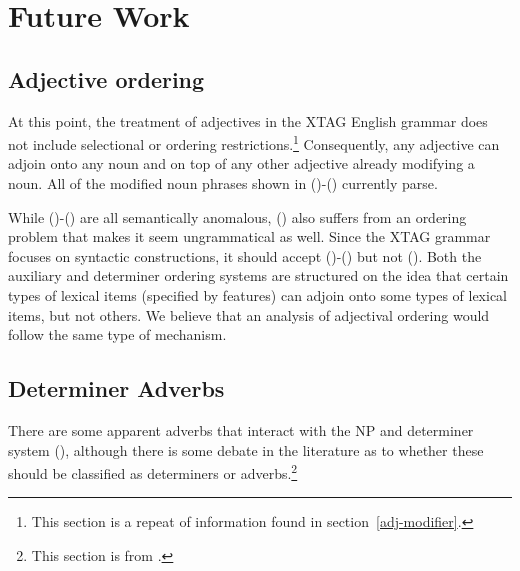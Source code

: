 \appendix
\chapter{Future Work}
\label{future-work}

\section{Adjective ordering}

At this point, the treatment of adjectives in the XTAG English grammar does not
include selectional or ordering restrictions.\footnote{This section is a repeat
of information found in section~\ref{adj-modifier}.} Consequently, any
adjective can adjoin onto any noun and on top of any other adjective already
modifying a noun. All of the modified noun phrases shown in ()-()
currently parse.


While ()-() are all semantically anomalous, () also suffers
from an ordering problem that makes it seem ungrammatical as well.  Since the
XTAG grammar focuses on syntactic constructions, it should accept
()-() but not ().  Both the auxiliary and determiner
ordering systems are structured on the idea that certain types of lexical items
(specified by features) can adjoin onto some types of lexical items, but not
others.  We believe that an analysis of adjectival ordering would follow the
same type of mechanism.



\section{Determiner Adverbs}

There are some apparent adverbs that interact with the NP and determiner system
(\cite{quirk85}), although there is some debate in the literature as to whether
these should be classified as determiners or adverbs.\footnote{This section is
from \cite{HockeyEgedi94}.}


